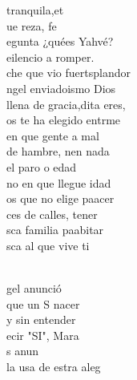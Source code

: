 \documentclass[12pt]{article}
\begin{document}
\begin{multicols*}{2}
\begin{cancion}%
	tranquila,et\\
	ue  reza, fe\\
	egunta ¿quées Yahvé? \\
	eilencio a romper.\\
	che que vio fuertsplandor\\
	ngel enviadoismo Dios\\
	llena de gracia,dita eres,\\
	os te ha elegido entrme\\
\jump
	en que gente a mal\\
	de hambre, nen nada\\
	 el paro o edad\\
	no en que llegue idad\\
	os que  no elige paacer\\
	ces de calles, tener\\
	sca familia paabitar\\
	sca al que vive ti\\\jump\\
	\begin{chorus}%
	gel anunció \\
	que un S nacer\\
	y sin entender \\
	ecir "SI", Mara\\
	s  anun \\
	la usa de estra aleg\\

\end{chorus}
\end{cancion}
\end{multicols*}
\end{document}
